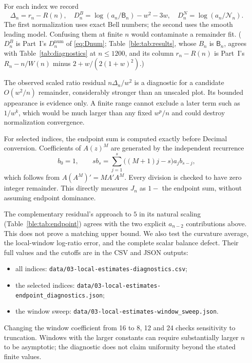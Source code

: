 \documentclass[11pt]{article}
\makeatletter
\numberwithin{equation}{section}
\theoremstyle{definition}
\theoremstyle{remark}
\newcommand{\lasttabletarget}{%
 \edef\@currentlabel{\thetable}\edef\@currentHref{table.\theHtable}}
\makeatother
\begin{document}
For each index we record
\[
 \Delta_n=r_n-R(n),\quad
 D_n^{B}=\log(a_n/\mathsf B_n)-w^2-3w,\quad
 D_n^{N}=\log(a_n/\mathcal N_n).
\]
The first normalization uses exact Bell numbers; the second uses the
smooth leading model. Confusing them at finite $n$ would contaminate a
remainder fit. ($D_n^B$ is Part~I's $D_n^{\mathrm{num}}$ of
\eqref{eq:Dnum}; Table~\ref{ble:tab:results}, whose $B_n$ is
$\mathsf B_n$, agrees with Table~\ref{tab:diagnostics} at $n\le1200$, and
its column $r_n-R(n)$ is Part~I's $R_n-n/W(n)$ minus
$2+w/(2(1+w)^2)$.)

{\lasttabletarget\label{ble:tab:results}}

The observed scaled ratio residual $n\Delta_n/w^2$ is a diagnostic for a
candidate $O(w^2/n)$ remainder, considerably stronger than an unscaled
plot. Its bounded appearance is evidence only. A finite range cannot
exclude a later term such as $1/w^k$, which would be much larger than any
fixed $w^p/n$ and could destroy normalization convergence.

For selected indices, the endpoint sum is computed exactly before Decimal
conversion. Coefficients of $A(z)^M$ are generated by the independent
recurrence
\[
 b_0=1,\qquad s b_s=\sum_{j=1}^{s}\big((M+1)j-s\big)a_jb_{s-j},
\]
which follows from $A(A^M)'=MA'A^M$. Every division is checked to have
zero integer remainder. This directly measures $J_n$ as $1-$ the endpoint
sum, without assuming endpoint dominance.

{\lasttabletarget\label{ble:tab:endpoint}}

The complementary residual's approach to $5$ in its natural scaling
(Table~\ref{ble:tab:endpoint}) agrees with the two explicit $a_{n-2}$
contributions above. This does not prove a matching upper bound. We also
test the curvature average, the local-window log-ratio error, and the
complete scalar balance defect. Their full values and the cutoffs are in
the CSV and JSON outputs:
\begin{itemize}[nosep]
\item all indices: \nolinkurl{data/03-local-estimates-diagnostics.csv};
\item the selected indices:
 \nolinkurl{data/03-local-estimates-endpoint_diagnostics.json};
\item the window sweep: \nolinkurl{data/03-local-estimates-window_sweep.json}.
\end{itemize}
Changing the window coefficient from 16 to 8, 12 and 24 checks sensitivity to truncation.
Windows with the larger constants can require substantially larger $n$ to
be asymptotic; the diagnostic does not claim uniformity beyond the stated
finite values.
\end{document}
